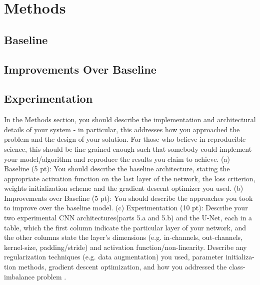 \section*{Methods}

\subsection*{Baseline}

\subsection*{Improvements Over Baseline}

\subsection*{Experimentation}

In the Methods section, you should describe the implementation and architectural details of your system - in particular, this addresses how you approached the problem and the design of your solution. For those who believe in reproducible science, this should be fine-grained enough such that somebody could implement your model/algorithm and reproduce the results you claim to achieve.
(a) Baseline (5 pt): You should describe the baseline architecture, stating the appropriate activation function on the last layer of the network, the loss criterion, weights initialization scheme and the gradient descent optimizer you used.
(b) Improvements over Baseline (5 pt): You should describe the approaches you took to improve over the baseline model.
(c) Experimentation (10 pt): Describe your two experimental CNN architectures(parts 5.a and 5.b) and the U-Net, each in a table, which the first column indicate the particular layer of your network, and the other columns state the layer’s dimensions (e.g. in-channels, out-channels, kernel-size, padding/stride) and activation function/non-linearity. Describe any regularization techniques (e.g. data augmentation) you used, parameter initializa- tion methods, gradient descent optimization, and how you addressed the class-imbalance problem .

